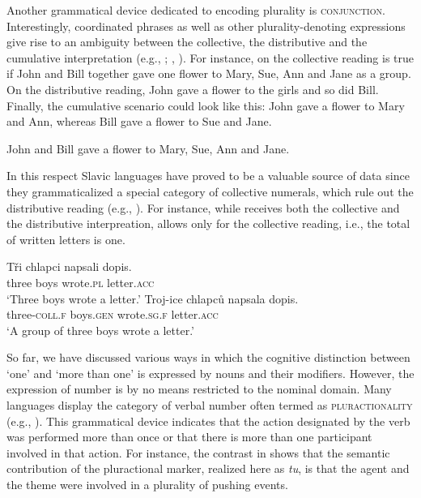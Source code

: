 \documentclass[output=paper]{langscibook}
\begin{document}
\noindent Another grammatical device dedicated to encoding plurality is \textsc{conjunction}. Interestingly, coordinated phrases as well as other plurality-denoting expressions give rise to an ambiguity between the collective, the distributive and the cumulative interpretation (e.g., \citealt{scha1981distributive, link1983logical, beck_sauerland2000cumulation, landman2000events}; , ). For instance,  on the collective reading is true if John and Bill together gave one flower to Mary, Sue, Ann and Jane as a group. On the distributive reading, John gave a flower to the girls and so did Bill. Finally, the cumulative scenario could look like this: John gave a flower to Mary and Ann, whereas Bill gave a flower to Sue and Jane.

\ea John and Bill gave a flower to Mary, Sue, Ann and Jane. \\ \hfill \citep[362]{beck_sauerland2000cumulation}\label{doc-wag:ex:conjunction}
\z

\noindent In this respect Slavic languages have proved to be a valuable source of data since they grammaticalized a special category of collective numerals, which rule out the distributive reading (e.g., \citealt{docekal2012atoms, wagiel2015sums}). For instance, while  receives both the collective and the distributive interpreation,  allows only for the collective reading, i.e., the total of written letters is one.

\ea \ea \gll Tři chlapci napsali dopis.\\
three boys wrote\textsc{.pl} letter\textsc{.acc}\\
\glt `Three boys wrote a letter.'\label{doc-wag:ex:czech-numeral} %
\ex \gll Troj-ice chlapců napsala dopis.\\
three-\textsc{coll.f} boys\textsc{.gen} wrote\textsc{.sg.f} letter\textsc{.acc}\\ %
\glt `A group of three boys wrote a letter.' \\ \hfill \citep[Czech;][113, adapted]{docekal2012atoms}\label{doc-wag:ex:czech-collective}
\z 
\z 

\noindent So far, we have discussed various ways in which the cognitive distinction between `one' and `more than one' is expressed by nouns and their modifiers. However, the expression of number is by no means restricted to the nominal domain. Many languages display the category of verbal number often termed as \textsc{pluractionality} (e.g., \citealt[Ch.~13]{lasersohn1995plurality}). This grammatical device indicates that the action designated by the verb was performed more than once or that there is more than one participant involved in that action. For instance, the contrast in  shows that the semantic contribution of the pluractional marker, realized here as \textit{tu}, is that the agent and the theme were involved in a plurality of pushing events.
\end{document}

